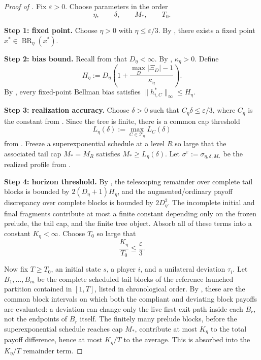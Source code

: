 \documentclass[12pt]{article}
\theoremstyle{definition}
\newcommand{\eps}{\varepsilon}
\newcommand{\1}{\mathbf{1}}
\newcommand{\cT}{\mathcal{T}}
\DeclareMathOperator{\BR}{BR}
\begin{document}
\begin{proof}[Proof of ]
Fix $\eps>0$. Choose parameters in the order
\[
\eta,\qquad \delta,\qquad M_*,\qquad T_0.
\]

\smallskip
\noindent\textbf{Step 1: fixed point.}
Choose $\eta>0$ with $\eta\le \eps/3$. By
, there exists a fixed point $x^*\in\BR_\eta(x^*)$.

\smallskip
\noindent\textbf{Step 2: bias bound.}
Recall from  that $D_\eta<\infty$. By
, $\kappa_\eta>0$. Define
\[
H_\eta:=D_\eta\left(1+\frac{\max_D|\Xi_D|-1}{\kappa_\eta}\right).
\]
By , every fixed-point Bellman bias satisfies
$\|h_{i,C}^*\|_\infty\le H_\eta$.

\smallskip
\noindent\textbf{Step 3: realization accuracy.}
Choose $\delta>0$ such that $C_\eta\delta\le \eps/3$, where $C_\eta$ is the
constant from . Since the tree is finite, there is a
common cap threshold
\[
L_\eta(\delta):=\max_{C\in\cT_\eta}L_C(\delta)
\]
from . Freeze a superexponential schedule at a level
$R$ so large that the associated tail cap $M_*=M_R$ satisfies
$M_*\ge L_\eta(\delta)$. Let
$\sigma^\eps:=\sigma_{\eta,\delta,M_*}$ be the realized profile from
.

\smallskip
\noindent\textbf{Step 4: horizon threshold.}
By , the telescoping remainder over complete tail blocks is
bounded by $2(D_\eta+1)H_\eta$, and the augmented/ordinary payoff discrepancy over
complete blocks is bounded by $2D_\eta^2$. The incomplete initial and final
fragments contribute at most a finite constant depending only on the frozen
prelude, the tail cap, and the finite tree object. Absorb all of these terms
into a constant $K_\eta<\infty$.
Choose $T_0$ so large that
\[
\frac{K_\eta}{T_0}\le \frac{\eps}{3}.
\]

Now fix $T\ge T_0$, an initial state $s$, a player $i$, and a unilateral
deviation $\tau_i$. Let $B_1,\dots,B_m$ be the complete scheduled tail blocks of
the reference launched partition contained in $[1,T]$, listed in chronological
order. By , these are the common block
intervals on which both the compliant and deviating block payoffs are evaluated:
a deviation can change only the live first-exit path inside each $B_r$, not the
endpoints of $B_r$ itself. The finitely many prelude blocks, before the
superexponential schedule reaches cap $M_*$, contribute at most $K_\eta$ to the
total payoff difference, hence at most $K_\eta/T$ to the average. This is
absorbed into the $K_\eta/T$ remainder term.


\end{proof}
\end{document}
